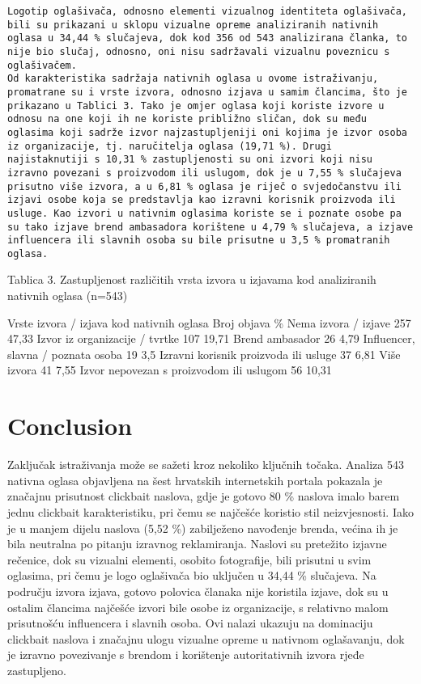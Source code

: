 \documentclass[preprint, 3p,
authoryear]{elsarticle} %
\begin{document}
\begin{verbatim}
Logotip oglašivača, odnosno elementi vizualnog identiteta oglašivača, bili su prikazani u sklopu vizualne opreme analiziranih nativnih oglasa u 34,44 % slučajeva, dok kod 356 od 543 analizirana članka, to nije bio slučaj, odnosno, oni nisu sadržavali vizualnu poveznicu s oglašivačem. 
Od karakteristika sadržaja nativnih oglasa u ovome istraživanju, promatrane su i vrste izvora, odnosno izjava u samim člancima, što je prikazano u Tablici 3. Tako je omjer oglasa koji koriste izvore u odnosu na one koji ih ne koriste približno sličan, dok su među oglasima koji sadrže izvor najzastupljeniji oni kojima je izvor osoba iz organizacije, tj. naručitelja oglasa (19,71 %). Drugi najistaknutiji s 10,31 % zastupljenosti su oni izvori koji nisu izravno povezani s proizvodom ili uslugom, dok je u 7,55 % slučajeva prisutno više izvora, a u 6,81 % oglasa je riječ o svjedočanstvu ili izjavi osobe koja se predstavlja kao izravni korisnik proizvoda ili usluge. Kao izvori u nativnim oglasima koriste se i poznate osobe pa su tako izjave brend ambasadora korištene u 4,79 % slučajeva, a izjave influencera ili slavnih osoba su bile prisutne u 3,5 % promatranih oglasa. 
\end{verbatim}

Tablica 3. Zastupljenost različitih vrsta izvora u izjavama kod
analiziranih nativnih oglasa (n=543)

Vrste izvora / izjava kod nativnih oglasa Broj objava \% Nema izvora /
izjave 257 47,33 Izvor iz organizacije / tvrtke 107 19,71 Brend
ambasador 26 4,79 Influencer, slavna / poznata osoba 19 3,5 Izravni
korisnik proizvoda ili usluge 37 6,81 Više izvora 41 7,55 Izvor
nepovezan s proizvodom ili uslugom 56 10,31

\hypertarget{conclusion}{%
\section{Conclusion}\label{conclusion}}

Zaključak istraživanja može se sažeti kroz nekoliko ključnih točaka.
Analiza 543 nativna oglasa objavljena na šest hrvatskih internetskih
portala pokazala je značajnu prisutnost clickbait naslova, gdje je
gotovo 80 \% naslova imalo barem jednu clickbait karakteristiku, pri
čemu se najčešće koristio stil neizvjesnosti. Iako je u manjem dijelu
naslova (5,52 \%) zabilježeno navođenje brenda, većina ih je bila
neutralna po pitanju izravnog reklamiranja. Naslovi su pretežito izjavne
rečenice, dok su vizualni elementi, osobito fotografije, bili prisutni u
svim oglasima, pri čemu je logo oglašivača bio uključen u 34,44 \%
slučajeva. Na području izvora izjava, gotovo polovica članaka nije
koristila izjave, dok su u ostalim člancima najčešće izvori bile osobe
iz organizacije, s relativno malom prisutnošću influencera i slavnih
osoba. Ovi nalazi ukazuju na dominaciju clickbait naslova i značajnu
ulogu vizualne opreme u nativnom oglašavanju, dok je izravno povezivanje
s brendom i korištenje autoritativnih izvora rjeđe zastupljeno.

\renewcommand\refname{References}

\end{document}
